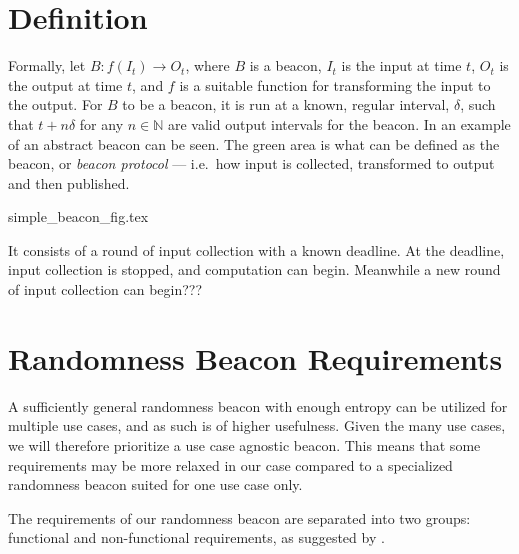\section{Definition}


Formally, let $B: f(I_t) \rightarrow O_t$, where $B$ is a beacon, $I_t$ is the input at time $t$, $O_t$ is the output at time $t$, and $f$ is a suitable function for transforming the input to the output.
For $B$ to be a beacon, it is run at a known, regular interval, $\delta$, such that $t+n\delta$ for any $n \in \mathbb{N}$ are valid output intervals for the beacon.
In  an example of an abstract beacon can be seen.
The green area is what can be defined as the beacon, or \emph{beacon protocol} --- i.e.\ how input is collected, transformed to output and then published.

{simple_beacon_fig.tex}


It consists of a round of input collection with a known deadline. At the deadline, input collection is stopped, and computation can begin. Meanwhile a new round of input collection can begin???

\section{Randomness Beacon Requirements}
\label{sec:beacon_requirements}

A sufficiently general randomness beacon with enough entropy can be utilized for multiple use cases, and as such is of higher usefulness. Given the many use cases, we will therefore prioritize a use case agnostic beacon.
This means that some requirements may be more relaxed in our case compared to a specialized randomness beacon suited for one use case only.%

The requirements of our randomness beacon are separated into two groups: functional and non-functional requirements, as suggested by \citet[sec.\ 1.4.1]{swebok} .

